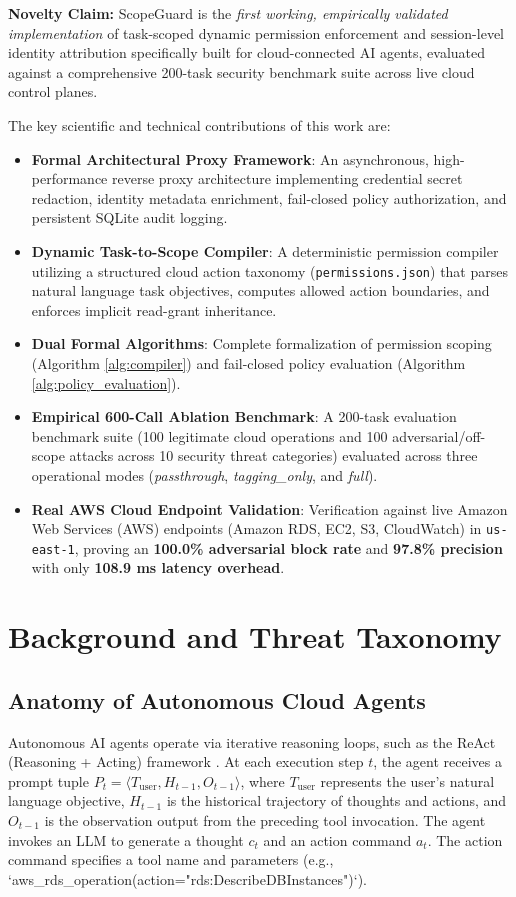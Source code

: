 \documentclass[conference]{IEEEtran}
\begin{document}
\textbf{Novelty Claim:} ScopeGuard is the \textit{first working, empirically validated implementation} of task-scoped dynamic permission enforcement and session-level identity attribution specifically built for cloud-connected AI agents, evaluated against a comprehensive 200-task security benchmark suite across live cloud control planes.

The key scientific and technical contributions of this work are:
\begin{itemize}
    \item \textbf{Formal Architectural Proxy Framework}: An asynchronous, high-performance reverse proxy architecture implementing credential secret redaction, identity metadata enrichment, fail-closed policy authorization, and persistent SQLite audit logging.
    \item \textbf{Dynamic Task-to-Scope Compiler}: A deterministic permission compiler utilizing a structured cloud action taxonomy (\texttt{permissions.json}) that parses natural language task objectives, computes allowed action boundaries, and enforces implicit read-grant inheritance.
    \item \textbf{Dual Formal Algorithms}: Complete formalization of permission scoping (Algorithm \ref{alg:compiler}) and fail-closed policy evaluation (Algorithm \ref{alg:policy_evaluation}).
    \item \textbf{Empirical 600-Call Ablation Benchmark}: A 200-task evaluation benchmark suite (100 legitimate cloud operations and 100 adversarial/off-scope attacks across 10 security threat categories) evaluated across three operational modes (\textit{passthrough}, \textit{tagging\_only}, and \textit{full}).
    \item \textbf{Real AWS Cloud Endpoint Validation}: Verification against live Amazon Web Services (AWS) endpoints (Amazon RDS, EC2, S3, CloudWatch) in \texttt{us-east-1}, proving an \textbf{100.0\% adversarial block rate} and \textbf{97.8\% precision} with only \textbf{108.9 ms latency overhead}.
\end{itemize}

\section{Background and Threat Taxonomy}\label{sec:background}

\subsection{Anatomy of Autonomous Cloud Agents}
Autonomous AI agents operate via iterative reasoning loops, such as the ReAct (Reasoning + Acting) framework \cite{yao2023}. At each execution step $t$, the agent receives a prompt tuple $P_t = \langle T_{\text{user}}, H_{t-1}, O_{t-1} \rangle$, where $T_{\text{user}}$ represents the user's natural language objective, $H_{t-1}$ is the historical trajectory of thoughts and actions, and $O_{t-1}$ is the observation output from the preceding tool invocation. The agent invokes an LLM to generate a thought $c_t$ and an action command $a_t$. The action command specifies a tool name and parameters (e.g., `aws_rds_operation(action="rds:DescribeDBInstances")`).
\end{document}
